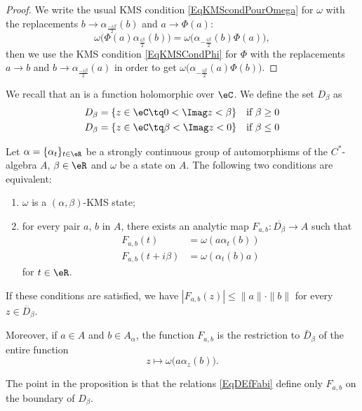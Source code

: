 \begin{proof}
	We write the usual KMS condition \eqref{EqKMScondPourOmega} for $\omega$ with the replacements $b\to \alpha_{\frac{ -i\beta }{2}}(b)$ and $a\to \Phi(a)$:
	\begin{equation}
		\omega\big( \Phi(a)\alpha_{\frac{ i\beta }{2}}(b) \big)=\omega\big( \alpha_{-\frac{ i\beta }{2}}(b)\Phi(a) \big),
	\end{equation}
	then we use the KMS condition \eqref{EqKMSCondPhi} for $\Phi$ with the replacements $a\to b$ and $b\to\alpha_{\frac{ -i\beta }{2}}(a)$ in order to get $\omega\big( \alpha_{-\frac{ i\beta }{2}}(a)\Phi(b) \big)$.
\end{proof}

We recall that an  is a function holomorphic over $\eC$. We define the set $D_{\beta}$ as
\begin{equation}
	\begin{aligned}[]
		D_{\beta}&=\{ z\in\eC\tq 0<\Imag z<\beta \}	&\text{if $\beta\geq 0$}\\
		D_{\beta}&=\{ z\in\eC\tq \beta<\Imag z<0 \}	&\text{if $\beta\leq 0$}
	\end{aligned}
\end{equation}

\begin{proposition}
	Let $\alpha=\{ \alpha_t \}_{t\in\eR}$ be a strongly continuous group of automorphisms of the $C^*$-algebra $A$, $\beta\in\eR$ and $\omega$ be a state on $A$. The following two conditions are equivalent:
	\begin{enumerate}
		\item
			$\omega$ is a $(\alpha,\beta)$-KMS state;
		\item
			for every pair $a$, $b$ in $A$, there exists an analytic map $F_{a,b}\colon \overline{ D_{\beta} }\to A$ such that
			\begin{subequations}		\label{EqDEfFabi}
				\begin{align}
					F_{a,b}(t)&=\omega(a\alpha_t(b))\\
					F_{a,b}(t+i\beta)&=\omega(\alpha_t(b)a)
				\end{align}
			\end{subequations}
			for $t\in\eR$.
	\end{enumerate}
	If these conditions are satisfied, we have $| F_{a,b}(z) |\leq\| a \|\cdot\| b \|$ for every $z\in\overline{ D }_{\beta}$.

	Moreover, if $a\in A$ and $b\in A_{\alpha}$, the function $F_{a,b}$ is the restriction to $\bar D_{\beta}$ of the entire function 
	\begin{equation}
		z\mapsto\omega\big( a\alpha_z(b) \big).
	\end{equation}
\end{proposition}
The point in the proposition is that the relations \eqref{EqDEfFabi} define only $F_{a,b}$ on the boundary of $D_{\beta}$.

